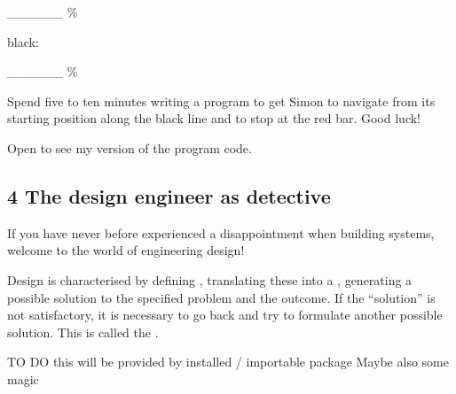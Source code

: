 \documentclass[letterpaper,10pt,english]{sphinxmanual}
\begin{document}
{\_\_\_\_\_\_ \%









black:





\_\_\_\_\_\_ \%









Spend five to ten minutes writing a program to get Simon to navigate from its starting position along the black line and to stop at the red bar. Good luck!

Open  to see my version of the program code.

{
\begin{sphinxVerbatim}[commandchars=\\\{\}]
\llap{\color{nbsphinxin}[ ]:\,\hspace{\fboxrule}\hspace{\fboxsep}}
\end{sphinxVerbatim}
}


\subsection{4 The design engineer as detective}
\label{\detokenize{content/04_Robot_Lab/Section_00_04:4-The-design-engineer-as-detective}}\label{\detokenize{content/04_Robot_Lab/Section_00_04::doc}}
If you have never before experienced a disappointment when building systems, welcome to the world of engineering design!

Design is characterised by defining , translating these into a , generating a possible solution to the specified problem and  the outcome. If the “solution” is not satisfactory, it is necessary to go back and try to formulate another possible solution. This is called the  .

{
\begin{sphinxVerbatim}[commandchars=\\\{\}]
\llap{\color{nbsphinxin}[ ]:\,\hspace{\fboxrule}\hspace{\fboxsep}}\PYGZsh{} TO DO \PYGZhy{} this will be provided by installed / importable package
\PYGZsh{} Maybe also some magic


\end{sphinxVerbatim}}}
\end{document}
